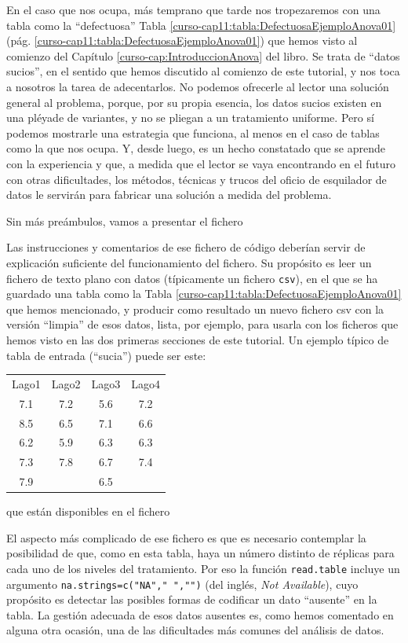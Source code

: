 \documentclass[10pt,a4paper]{article}\usepackage[]{graphicx}\usepackage[]{color}
\newcounter {cont01}
\begin{document}
En el caso que nos ocupa, más temprano que tarde nos tropezaremos con una tabla como la ``defectuosa'' Tabla \ref{curso-cap11:tabla:DefectuosaEjemploAnova01} (pág. \ref{curso-cap11:tabla:DefectuosaEjemploAnova01}) que hemos visto al comienzo del Capítulo \ref{curso-cap:IntroduccionAnova} del libro. Se trata de ``datos sucios'', en el sentido que hemos discutido al comienzo de este tutorial, y nos toca a nosotros la tarea de adecentarlos. No podemos ofrecerle al lector una solución general al problema, porque, por su propia esencia, los datos sucios existen en una pléyade de variantes, y no se pliegan a un tratamiento uniforme. Pero sí podemos mostrarle una estrategia que funciona, al menos en el caso de tablas como la que nos ocupa. Y, desde luego,  es un hecho constatado que se aprende con la experiencia y que, a medida que el lector se vaya encontrando en el futuro con otras dificultades, los métodos, técnicas y trucos del oficio de esquilador de datos le servirán para fabricar una solución a medida del problema.

Sin más preámbulos, vamos a presentar el fichero
\begin{center}
\end{center}
Las instrucciones y comentarios de ese fichero de código deberían servir de explicación suficiente del funcionamiento del fichero. Su propósito es leer un fichero de texto plano con datos (típicamente un fichero {\tt csv}), en el que se ha guardado una tabla como la Tabla \ref{curso-cap11:tabla:DefectuosaEjemploAnova01} que hemos mencionado, y producir como resultado un nuevo fichero csv con la versión ``limpia'' de esos datos, lista, por ejemplo, para usarla con los ficheros que hemos visto en las dos primeras secciones de este tutorial. Un ejemplo típico de tabla de entrada (``sucia'') puede ser este:
\begin{center}
\begin{tabular}{cccc}
Lago1&Lago2&Lago3&Lago4\\
7.1&7.2&5.6&7.2\\
8.5&6.5&7.1&6.6\\
6.2&5.9&6.3&6.3\\
7.3&7.8&6.7&7.4\\
7.9&&6.5
\end{tabular}
\end{center}

que están disponibles en el fichero
\begin{center}
\end{center}
El aspecto más complicado de ese fichero es que es necesario contemplar la posibilidad de que, como en esta tabla, haya un número distinto de réplicas para cada uno de los niveles del tratamiento. Por eso la función {\tt read.table} incluye un argumento {\tt na.strings=c("NA"," ","")} (del inglés, {\em Not Available}), cuyo propósito es detectar las posibles formas de codificar un dato ``ausente'' en la tabla. La gestión adecuada de esos datos ausentes es, como hemos comentado en alguna otra ocasión, una de las dificultades más comunes del análisis de datos.
\end{document}
